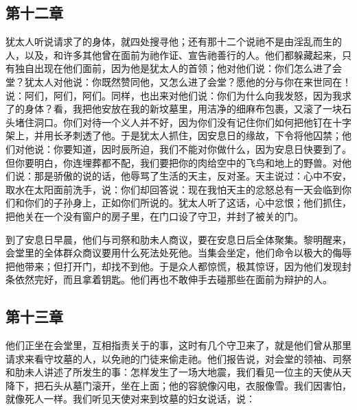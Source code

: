 
\subsection{第十二章}

犹太人听说请求了的身体，就四处搜寻他；还有那十二个说祂不是由淫乱而生的人，以及，和许多其他曾在面前为祂作证、宣告祂善行的人。他们都躲藏起来，只有独自出现在他们面前，因为他是犹太人的首领；他对他们说：你们怎么进了会堂？犹太人对他说：你既然赞同他，又怎么进了会堂？愿他的分与你在来世同在！说：阿们，阿们，阿们。同样，也出来对他们说：你们为什么向我发怒，因为我求了的身体？看，我把他安放在我的新坟墓里，用洁净的细麻布包裹，又滚了一块石头堵住洞口。你们对待一个义人并不好，因为你们没有记住你们如何把他钉在十字架上，并用长矛刺透了他。于是犹太人抓住，因安息日的缘故，下令将他囚禁；他们对他说：你要知道，因时辰所迫，我们不能对你做什么，因为安息日快要到了。但你要明白，你连埋葬都不配，我们要把你的肉给空中的飞鸟和地上的野兽。对他们说：那是骄傲的说的话，他辱骂了生活的天主，反对圣。天主说过：心中不安，取水在太阳面前洗手，说：你们却回答说：现在我怕天主的忿怒总有一天会临到你们和你们的子孙身上，正如你们所说的。犹太人听了这话，心中忿恨；他们抓住，把他关在一个没有窗户的房子里，在门口设了守卫，并封了被关的门。\par

到了安息日早晨，他们与司祭和肋未人商议，要在安息日后全体聚集。黎明醒来，会堂里的全体群众商议要用什么死法处死他。当集会坐定，他们命令以极大的侮辱把他带来；但打开门，却找不到他。于是众人都惊慌，极其惊讶，因为他们发现封条依然完好，而且拿着钥匙。他们再也不敢伸手去碰那些在面前为辩护的人。\par


\subsection{第十三章}

他们正坐在会堂里，互相指责关于的事，这时有几个守卫来了，就是他们曾从那里请求来看守坟墓的人，以免祂的门徒来偷走祂。他们报告说，对会堂的领袖、司祭和肋未人讲述了所发生的事：怎样发生了一场大地震，我们看见一位主的天使从天降下，把石头从墓门滚开，坐在上面；他的容貌像闪电，衣服像雪。我们因害怕，就像死人一样。我们听见天使对来到坟墓的妇女说话，说：\par

